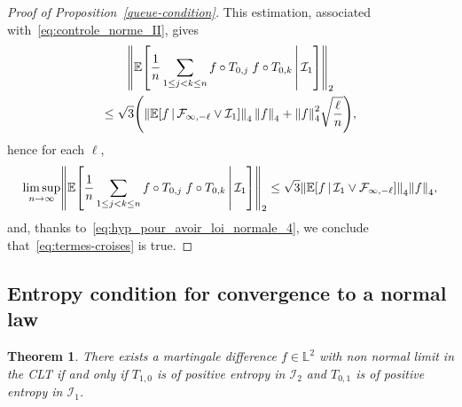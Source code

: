\documentclass[10pt]{amsart}
\newtheorem{theo}{Theorem}[section]
\theoremstyle{definition}\newtheorem{defi}[theo]{Definition}\newtheorem{rema}[theo]{Remark}\newtheorem{exam}[theo]{Example}\newtheorem{exem}[theo]{Example}\newtheorem{nota}[theo]{Notation}
\newcommand*\bbL{\mathbb{L}}
\newcommand{\bbE}{\mathbb{E}}
\newcommand{\E}[1]{\bbE\left[#1\right]}
\newcommand*\I{\mathcal{I}}
\newcommand*\F{\mathcal{F}}
\newcommand{\norm}[1]{\left\lVert #1\right\rVert}
\renewcommand*{\to}{\mathchoice{\longrightarrow}{\rightarrow}{\rightarrow}{\rightarrow}}
\let\originalleft\left
\let\originalright\right
\renewcommand{\left}{\mathopen{}\mathclose\bgroup\originalleft}
\renewcommand{\right}{\aftergroup\egroup\originalright}
\begin{document}
\begin{proof}[Proof of Proposition~\ref{queue-condition}]
This estimation, associated with~\eqref{eq:controle_norme_II}, gives
\begin{multline*}
\norm{\E{\frac1n\sum_{1\leq j< k\leq n}f\circ T_{0,j}\;f\circ T_{0,k}\,\middle|\,\I_1}}_2
\\
\leq\sqrt3\left(\norm{\E{f \,\middle|\,\F_{\infty,-\ell}\vee\I_1}}_4\,\norm{f}_4+ \norm{f}_4^2\sqrt{\frac{\ell}{n}}\right),
\end{multline*}
hence for each $\ell$,
\begin{equation*}
\limsup_{n\to\infty}\norm{\E{\frac1n\sum_{1\leq j< k\leq n}f\circ T_{0,j}\;f\circ T_{0,k}\,\middle|\,\I_1}}_2\leq \sqrt{3}
\norm{\E{f \,\middle|\,\I_{1}\vee \F_{\infty, -\ell}}}_4\norm{f}_4,
\end{equation*}
and, thanks to~\eqref{eq:hyp_pour_avoir_loi_normale_4}, we conclude that~\eqref{eq:termes-croises} is true.
\end{proof}
\subsection{Entropy condition for convergence to a normal law}\label{entropie}

\begin{theo}\label{pos-entropy}
There exists a martingale difference $f\in \bbL^2$ with non normal limit in the CLT if and only if $T_{1,0}$ is of positive entropy in $\I_2$ and $T_{0,1}$ is of positive entropy in $\I_1$.
\end{theo}
\end{document}
